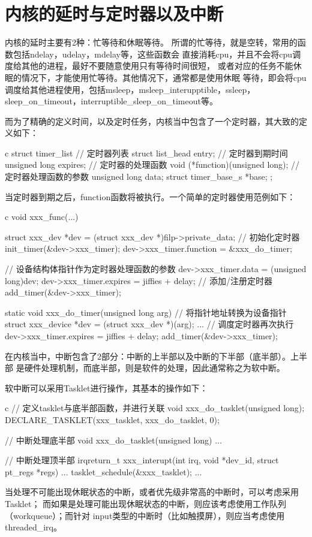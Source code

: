 \section{内核的延时与定时器以及中断}
内核的延时主要有2种：忙等待和休眠等待。
所谓的忙等待，就是空转，常用的函数包括ndelay，udelay，mdelay等，这些函数会
直接消耗cpu，并且不会将cpu调度给其他的进程，最好不要随意使用只有等待时间很短，
或者对应的任务不能休眠的情况下，才能使用忙等待。其他情况下，通常都是使用休眠
等待，即会将cpu调度给其他进程使用，包括msleep，msleep\_interupptible，ssleep，
sleep\_on\_timeout，interruptible\_sleep\_on\_timeout等。

而为了精确的定义时间，以及定时任务，内核当中包含了一个定时器，其大致的定义如下：
\begin{code-block}{c}
struct timer_list {
        // 定时器列表
        struct list_head entry;
        // 定时器到期时间
        unsigned long expires;
        // 定时器的处理函数
        void (*function)(unsigned long);
        // 定时器处理函数的参数
        unsigned long data;
        struct timer_base_s *base;
};
\end{code-block}
当定时器到期之后，function函数将被执行。一个简单的定时器使用范例如下：
\begin{code-block}{c}
void xxx_func(...)
{
        struct xxx_dev *dev = (struct xxx_dev *)filp->private_data;
        // 初始化定时器
        init_timer(&dev->xxx_timer);
        dev->xxx_timer.function = &xxx_do_timer;

        // 设备结构体指针作为定时器处理函数的参数
        dev->xxx_timer.data = (unsigned long)dev;
        dev->xxx_timer.expires = jiffies + delay;
        //  添加/注册定时器
        add_timer(&dev->xxx_timer);
}

static void xxx_do_timer(unsigned long arg)
{
        // 将指针地址转换为设备指针
        struct xxx_device *dev = (struct xxx_dev *)(arg);
        ...
        // 调度定时器再次执行
        dev->xxx_timer.expires = jiffies + delay;
        add_timer(&dev->xxx_timer);
}
\end{code-block}

在内核当中，中断包含了2部分：中断的上半部以及中断的下半部（底半部）。上半部
是硬件处理机制，而底半部，则是软件的处理，因此通常称之为软中断。

软中断可以采用Tasklet进行操作，其基本的操作如下：
\begin{code-block}{c}
// 定义tasklet与底半部函数，并进行关联
void xxx_do_tasklet(unsigned long);
DECLARE_TASKLET(xxx_tasklet, xxx_do_tasklet, 0);

// 中断处理底半部
void xxx_do_tasklet(unsigned long)
{
        ...
}

// 中断处理顶半部
irqreturn_t xxx_interupt(int irq, void *dev_id, struct pt_regs *regs)
{
        ...
        tasklet_schedule(&xxx_tasklet);
        ...
}
\end{code-block}
当处理不可能出现休眠状态的中断，或者优先级非常高的中断时，可以考虑采用Tasklet；
而如果是处理可能出现休眠状态的中断，则应该考虑使用工作队列（workqueue）；而针对
input类型的中断时（比如触摸屏），则应当考虑使用threaded\_irq。

